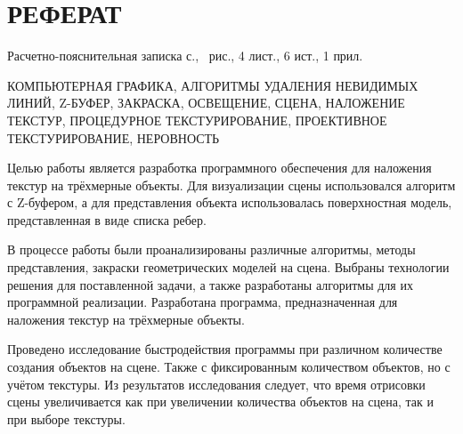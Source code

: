 \section*{\centering РЕФЕРАТ}
\setcounter{page}{2}

Расчетно-пояснительная записка \pageref{LastPage} с., \totalfigures\ рис., 4 лист., 6 ист., 1 прил.

КОМПЬЮТЕРНАЯ ГРАФИКА, АЛГОРИТМЫ УДАЛЕНИЯ НЕВИДИМЫХ ЛИНИЙ, Z-БУФЕР, ЗАКРАСКА, ОСВЕЩЕНИЕ, СЦЕНА, НАЛОЖЕНИЕ ТЕКСТУР, ПРОЦЕДУРНОЕ ТЕКСТУРИРОВАНИЕ, ПРОЕКТИВНОЕ ТЕКСТУРИРОВАНИЕ, НЕРОВНОСТЬ

Целью работы является разработка программного обеспечения для наложения текстур на трёхмерные объекты.
Для визуализации сцены использовался алгоритм с Z-буфером, а для представления объекта использовалась поверхностная модель, представленная в виде списка ребер.

В процессе работы были проанализированы различные алгоритмы, методы представления, закраски геометрических моделей на сцена. Выбраны технологии решения для поставленной задачи, а также разработаны алгоритмы для их программной реализации. Разработана программа, предназначенная для наложения текстур на трёхмерные объекты.

Проведено исследование быстродействия программы при различном количестве создания объектов на сцене. 
Также с фиксированным количеством объектов, но с учётом текстуры. 
Из результатов исследования следует, что время отрисовки сцены увеличивается как при увеличении количества объектов на сцена, так и при выборе текстуры.